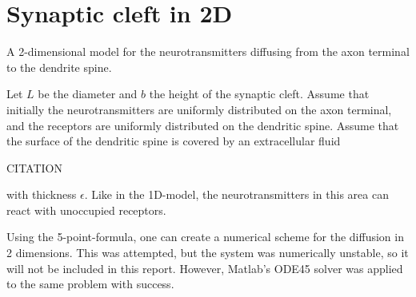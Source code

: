 \section*{Synaptic cleft in 2D}

A 2-dimensional model for the neurotransmitters diffusing from the axon terminal to the dendrite spine.

Let $L$ be the diameter and $b$ the height of the synaptic cleft. Assume that initially the neurotransmitters are uniformly distributed on the axon terminal, and the receptors are uniformly distributed on the dendritic spine. Assume that the surface of the dendritic spine is covered by an extracellular fluid 

CITATION

with thickness $\epsilon$. Like in the 1D-model, the neurotransmitters in this area can react with unoccupied receptors. 

Using the 5-point-formula, one can create a numerical scheme for the diffusion in 2 dimensions. This was attempted, but the system was numerically unstable, so it will not be included in this report. However, Matlab's ODE45 solver was applied to the same problem with success. 

